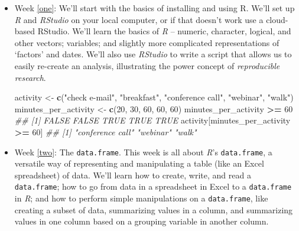 \documentclass[
]{book}
\newenvironment{Shaded}{\begin{snugshade}}{\end{snugshade}}
\newcommand{\CommentTok}[1]{\textcolor[rgb]{0.56,0.35,0.01}{\textit{#1}}}
\newcommand{\DecValTok}[1]{\textcolor[rgb]{0.00,0.00,0.81}{#1}}
\newcommand{\KeywordTok}[1]{\textcolor[rgb]{0.13,0.29,0.53}{\textbf{#1}}}
\newcommand{\NormalTok}[1]{#1}
\newcommand{\OperatorTok}[1]{\textcolor[rgb]{0.81,0.36,0.00}{\textbf{#1}}}
\newcommand{\StringTok}[1]{\textcolor[rgb]{0.31,0.60,0.02}{#1}}
\begin{document}
\begin{itemize}
\item
  Week \ref{one}: We'll start with the basics of installing and using R. We'll set up \emph{R} and \emph{RStudio} on your local computer, or if that doesn't work use a cloud-based RStudio. We'll learn the basics of \emph{R} -- numeric, character, logical, and other vectors; variables; and slightly more complicated representations of `factors' and dates. We'll also use \emph{RStudio} to write a script that allows us to easily re-create an analysis, illustrating the power concept of \emph{reproducible research}.

\begin{Shaded}
\begin{Highlighting}[]
\NormalTok{activity <-}\StringTok{ }\KeywordTok{c}\NormalTok{(}\StringTok{"check e-mail"}\NormalTok{, }\StringTok{"breakfast"}\NormalTok{, }\StringTok{"conference call"}\NormalTok{, }\StringTok{"webinar"}\NormalTok{, }\StringTok{"walk"}\NormalTok{)}
\NormalTok{minutes_per_activity <-}\StringTok{ }\KeywordTok{c}\NormalTok{(}\DecValTok{20}\NormalTok{, }\DecValTok{30}\NormalTok{, }\DecValTok{60}\NormalTok{, }\DecValTok{60}\NormalTok{, }\DecValTok{60}\NormalTok{)}
\NormalTok{minutes_per_activity }\OperatorTok{>=}\StringTok{ }\DecValTok{60}
\CommentTok{## [1] FALSE FALSE  TRUE  TRUE  TRUE}
\NormalTok{activity[minutes_per_activity }\OperatorTok{>=}\StringTok{ }\DecValTok{60}\NormalTok{]}
\CommentTok{## [1] "conference call" "webinar"         "walk"}
\end{Highlighting}
\end{Shaded}
\item
  Week \ref{two}: The \texttt{data.frame}. This week is all about \emph{R}'s \texttt{data.frame}, a versatile way of representing and manipulating a table (like an Excel spreadsheet) of data. We'll learn how to create, write, and read a \texttt{data.frame}; how to go from data in a spreadsheet in Excel to a \texttt{data.frame} in \emph{R}; and how to perform simple manipulations on a \texttt{data.frame}, like creating a subset of data, summarizing values in a column, and summarizing values in one column based on a grouping variable in another column.


\end{itemize}
\end{document}
